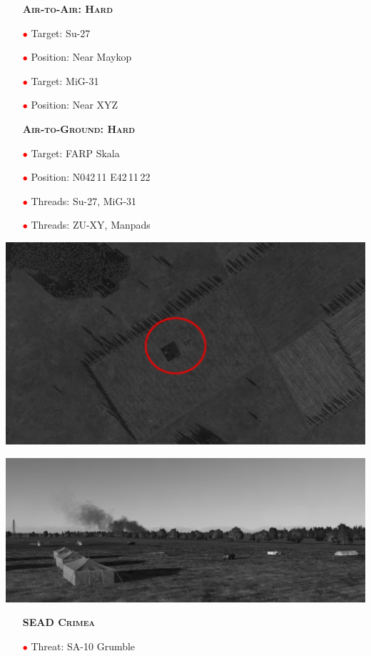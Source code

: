 \documentclass[a4paper,12pt,dvipsnames]{letter}
\newcommand{\myHead}[1]{{\LARGE\textsc{\textbf{#1}}}}
\newcommand{\ri}{\textcolor{Red}{$\bullet$\;}}
\begin{document}
{\begin{itemize}
 \item[] \myHead{Air-to-Air: Hard}
 \item[\ri] Target: Su-27
 \item[\ri] Position: Near Maykop
 \item[\ri] Target: MiG-31
 \item[\ri] Position: Near XYZ
\end{itemize}
%
\newpage
\begin{itemize}
 \item[] \myHead{Air-to-Ground: Hard}
 \item[\ri] Target: FARP Skala
 \item[\ri] Position: N042\,11 E42\,11\,22 
 \item[\ri] Threads: Su-27, MiG-31
 \item[\ri] Threads: ZU-XY, Manpads
\end{itemize}
\begin{center}
 \includegraphics[width=0.7\linewidth]{../gimp/FARP_Skala_Sat.png}
\end{center}
%
\begin{center}
 \includegraphics[width=0.7\linewidth]{../gimp/FARP_Skala_Pic.png}
\end{center}
%
\newpage
\begin{itemize}
 \item[] \myHead{SEAD Crimea}
 \item[\ri] Threat: SA-10 Grumble

\end{itemize}}
\end{document}
